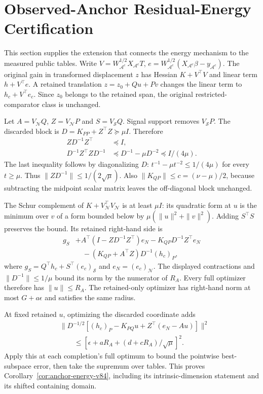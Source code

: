 \section{Observed-Anchor Residual-Energy Certification}\label{app:anchor-energy-v84}
This section supplies the extension that connects the energy mechanism to the measured public tables.
Write $V=W_{\mathcal A^c}^{1/2}X_{\mathcal A^c}T$, $e=W_{\mathcal A^c}^{1/2}(X_{\mathcal A^c}\beta-y_{\mathcal A^c})$. The original gain in transformed displacement $z$ has Hessian $K+V^\top V$ and linear term $h+V^\top e$. A retained translation $z=z_0+Qu+Pv$ changes the linear term to $h_c+V^\top e_c$. Since $z_0$ belongs to the retained span, the original restricted-comparator class is unchanged.

Let $A=V_{\mathcal N}Q$, $Z=V_{\mathcal N}P$ and $S=V_{\mathcal S}Q$. Signal support removes $V_{\mathcal S}P$. The discarded block is $D=K_{PP}+Z^\top Z\succeq\mu I$. Therefore
\begin{align*}
 ZD^{-1}Z^\top&\preceq I,\\
 D^{-1}Z^\top ZD^{-1}&\preceq D^{-1}-\mu D^{-2}\preceq I/(4\mu).
\end{align*}
The last inequality follows by diagonalizing $D$: $t^{-1}-\mu t^{-2}\le1/(4\mu)$ for every $t\ge\mu$. Thus $\|ZD^{-1}\|\le1/(2\sqrt\mu)$. Also $\|K_{QP}\|\le c=(\nu-\mu)/2$, because subtracting the midpoint scalar matrix leaves the off-diagonal block unchanged.

The Schur complement of $K+V_{\mathcal N}^\top V_{\mathcal N}$ is at least $\mu I$: its quadratic form at $u$ is the minimum over $v$ of a form bounded below by $\mu(\|u\|^2+\|v\|^2)$. Adding $S^\top S$ preserves the bound. Its retained right-hand side is
\begin{align*}
 g_S&+A^\top(I-ZD^{-1}Z^\top)e_N-K_{QP}D^{-1}Z^\top e_N\\
 &\quad-(K_{QP}+A^\top Z)D^{-1}(h_c)_P,
\end{align*}
where $g_S=Q^\top h_c+S^\top(e_c)_{\mathcal S}$ and $e_N=(e_c)_{\mathcal N}$. The displayed contractions and $\|D^{-1}\|\le1/\mu$ bound its norm by the numerator of $R_A$. Every full optimizer therefore has $\|u\|\le R_A$. The retained-only optimizer has right-hand norm at most $G+a\epsilon$ and satisfies the same radius.

At fixed retained $u$, optimizing the discarded coordinate adds
\begin{align*}
 &\|D^{-1/2}[(h_c)_P-K_{PQ}u+Z^\top(e_N-Au)]\|^2\\
 &\qquad\le[\epsilon+aR_A+(d+cR_A)/\sqrt\mu]^2.
\end{align*}
Apply this at each completion's full optimum to bound the pointwise best-subspace error, then take the supremum over tables. This proves Corollary~\ref{cor:anchor-energy-v84}, including its intrinsic-dimension statement and its shifted containing domain.

